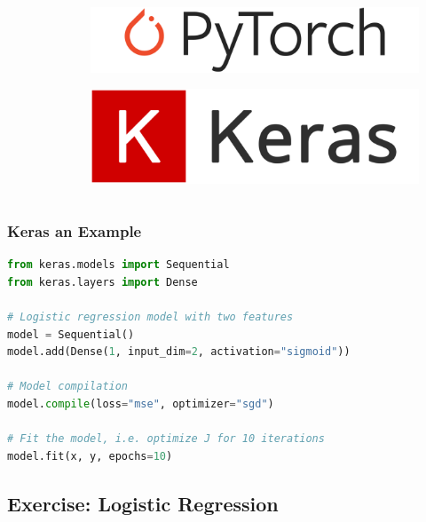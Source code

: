 \documentclass[aspectratio=169]{beamer}
\newcommand\imageright[1]{ %
    \caption*{\scalebox{.5}{\textcolor{lightgray}{\textcopyright~#1}}} %
}
\begin{document}
\begin{frame}
\begin{columns}
\begin{column}{0.23\textwidth}
\begin{figure}
            \imageright{Apache}
        \end{figure}
    \end{column}
    \begin{column}{0.23\textwidth}
        \vspace{2.5cm}
        \begin{figure}
            \centering
            \includegraphics[width=0.9\linewidth]{pytorch.png}
            \imageright{PyTorch}
        \end{figure}
        \begin{figure}
            \centering
            \includegraphics[width=0.9\linewidth]{keras.png}
            \imageright{Keras}
            \vspace{1.2cm}
        \end{figure}
    \end{column}
\end{columns}
\end{frame}

\begin{frame}[fragile]
\frametitle{Keras an Example}

\begin{lstlisting}[language=Python]
from keras.models import Sequential
from keras.layers import Dense

# Logistic regression model with two features
model = Sequential()
model.add(Dense(1, input_dim=2, activation="sigmoid"))

# Model compilation
model.compile(loss="mse", optimizer="sgd")

# Fit the model, i.e. optimize J for 10 iterations
model.fit(x, y, epochs=10)
\end{lstlisting}

\end{frame}

\subsection{Exercise: Logistic Regression}
\label{subsec:exercise-logistic-regression}
\end{document}

